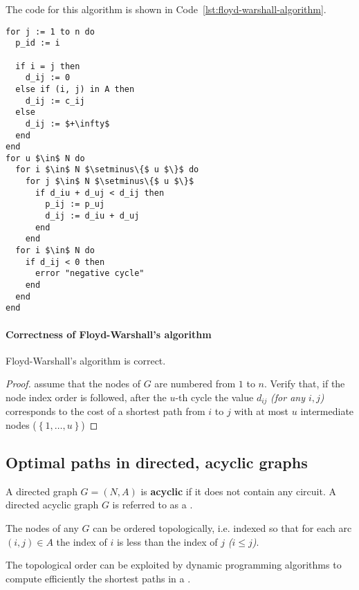 \documentclass[english]{article}
\begin{document}
\bigskip
The code for this algorithm is shown in Code~\ref{lst:floyd-warshall-algorithm}.

\begin{lstlisting}[caption={Floyd-Warshall's algorithm}, label={lst:floyd-warshall-algorithm}, float]
for j := 1 to n do
  p_id := i

  if i = j then
    d_ij := 0
  else if (i, j) in A then
    d_ij := c_ij
  else
    d_ij := $+\infty$
  end
end
for u $\in$ N do
  for i $\in$ N $\setminus\{$ u $\}$ do
    for j $\in$ N $\setminus\{$ u $\}$
      if d_iu + d_uj < d_ij then
        p_ij := p_uj
        d_ij := d_iu + d_uj
      end
    end
  for i $\in$ N do
    if d_ij < 0 then
      error "negative cycle"
    end
  end
end
\end{lstlisting}

\paragraph{Correctness of Floyd-Warshall's algorithm}

\begin{proposition}
  Floyd-Warshall's algorithm is correct.
\end{proposition}

\begin{proof}
  assume that the nodes of \(G\) are numbered from \(1\) to \(n\).
  Verify that, if the node index order is followed, after the \(u\)-th cycle the value \(d_{ij}\) \textit{(for any \(i, j\))} corresponds to the cost of a shortest path from \(i\) to \(j\) with at most \(u\) intermediate nodes (\(\left\{ 1, \ldots, u \right\}\))
\end{proof}

\subsection{Optimal paths in directed, acyclic graphs}

A directed graph \(G = (N, A)\) is \textbf{acyclic} if it does not contain any circuit.
A directed acyclic graph \(G\) is referred to as a \DAG.

\begin{property}
  The nodes of any \DAG \(G\) can be ordered topologically, i.e. indexed so that for each arc \((i, j) \in A\) the index of \(i\) is less than the index of \(j\) \textit{(\(i \leq j\))}.
\end{property}

The topological order can be exploited by dynamic programming algorithms to compute efficiently the shortest paths in a \DAG.
\end{document}
